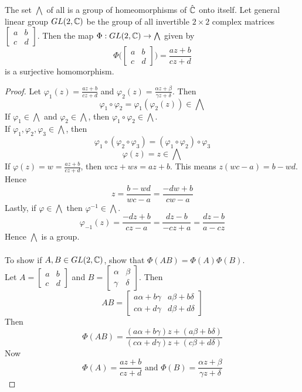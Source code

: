 \documentclass[12pt]{article}
\begin{document}
\begin{theorem} The set $\bigwedge$ of all \mobt is a group of homeomorphisms of $\hat{\mathbb{C}}$ onto itself. Let general linear group $GL(2,\mathbb{C})$ be the group of all invertible $2\times 2$ complex matrices $\begin{bmatrix} a & b \\ c & d \end{bmatrix}$. Then the map $\Phi: GL(2, \mathbb{C}) \to \bigwedge$ given by $$ \Phi\Big( \begin{bmatrix} a & b \\ c & d \end{bmatrix}\Big) = \frac{az+b}{cz+d}$$  is a surjective homomorphism. \end{theorem} 
\begin{proof} Let $\varphi_1(z) = \frac{az+b}{cz+d}$ and $\varphi_2(z) = \frac{\alpha z + \beta}{\gamma z + \delta}$. Then $$\varphi_1 \circ \varphi_2 = \varphi_1(\varphi_2(z)) \in \bigwedge  $$ 
If $\varphi_1 \in \bigwedge$ and $\varphi_2 \in \bigwedge$, then $\varphi_1 \circ \varphi_2 \in \bigwedge$. \\
If $\varphi_1,\varphi_2,\varphi_3 \in \bigwedge$, then $$\varphi_1 \circ (\varphi_2 \circ \varphi_3) = (\varphi_1 \circ \varphi_2) \circ \varphi_3$$ $$ \varphi(z) = z \in \bigwedge $$ 
If $\varphi(z) = w = \frac{az+b}{cz+d}$, then $wcz + ws = az+b$. This means $z(wc - a) = b-wd$. Hence $$z = \frac{b-wd}{wc-a} = \frac{-dw+b}{cw-a} $$ 
Lastly, if $\varphi \in \bigwedge$ then $\varphi^{-1} \in \bigwedge$.
$$ \varphi_{-1}(z) = \frac{-dz+b}{cz-a} = \frac{dz-b}{-cz + a} = \frac{dz-b}{a-cz} $$ Hence $\bigwedge$ is a group. \\~\\
To show if $A,B \in GL(2,\mathbb{C})$, show that $\Phi(AB) = \Phi(A)\Phi(B)$. \\
Let $A = \begin{bmatrix} a & b \\ c & d \end{bmatrix} $ and $B = \begin{bmatrix} \alpha & \beta \\ \gamma & \delta \end{bmatrix}$. Then $$AB = \begin{bmatrix} a\alpha + b\gamma & a\beta + b\delta \\ c\alpha + d\gamma & d\beta + d\delta \end{bmatrix} $$ 
Then $$\Phi(AB) = \frac{(a\alpha + b\gamma)z + (a\beta + b\delta)}{(c\alpha + d\gamma)z + (c\beta + d\delta)} $$ Now $$\Phi(A) = \frac{az+b}{cz+d} \text{ and } \Phi(B) = \frac{\alpha z + \beta}{\gamma z + \delta}$$ 

\end{proof}
\end{document}

